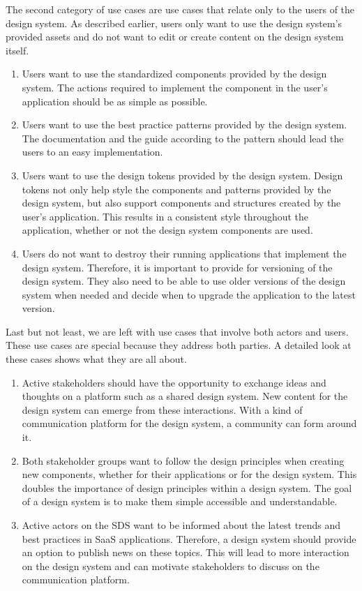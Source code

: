 The second category of use cases are use cases that relate only to the users of the design system. As described earlier, users only want to use the design system's provided assets and do not want to edit or create content on the design system itself.
\begin{enumerate}
    \item Users want to use the standardized components provided by the design system. The actions required to implement the component in the user's application should be as simple as possible.
    \item Users want to use the best practice patterns provided by the design system. The documentation and the guide according to the pattern should lead the users to an easy implementation.
    \item Users want to use the design tokens provided by the design system. Design tokens not only help style the components and patterns provided by the design system, but also support components and structures created by the user's application. This results in a consistent style throughout the application, whether or not the design system components are used.
    \item Users do not want to destroy their running applications that implement the design system. Therefore, it is important to provide for versioning of the design system. They also need to be able to use older versions of the design system when needed and decide when to upgrade the application to the latest version.
\end{enumerate}
Last but not least, we are left with use cases that involve both actors and users. These use cases are special because they address both parties. A detailed look at these cases shows what they are all about.
\begin{enumerate}
    \item Active stakeholders should have the opportunity to exchange ideas and thoughts on a platform such as a shared design system. New content for the design system can emerge from these interactions. With a kind of communication platform for the design system, a community can form around it. 
    \item Both stakeholder groups want to follow the design principles when creating new components, whether for their applications or for the design system. This doubles the importance of design principles within a design system. The goal of a design system is to make them simple accessible and understandable.
    \item Active actors on the SDS want to be informed about the latest trends and best practices in SaaS applications. Therefore, a design system should provide an option to publish news on these topics. This will lead to more interaction on the design system and can motivate stakeholders to discuss on the communication platform.
\end{enumerate}

